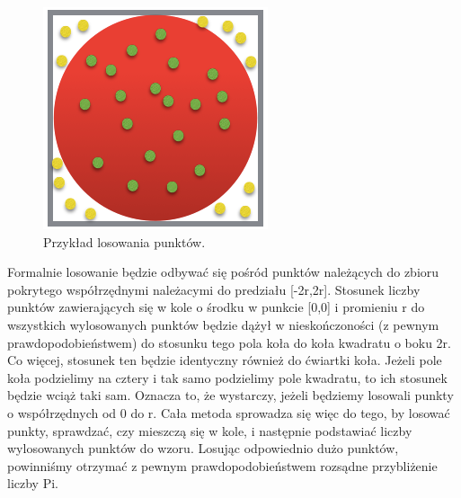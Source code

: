 \documentclass[a4paper,12pt]{article}		%
\begin{document}
\begin{figure}[h!]
\centering
\includegraphics[scale=0.7]{Resources/Losowanie.png}
\caption{Przykład losowania punktów.}
\end{figure}
 Formalnie losowanie będzie odbywać się pośród punktów należących do zbioru pokrytego współrzędnymi należacymi do predziału [-2r,2r]. Stosunek liczby punktów
zawierających się w kole o środku w punkcie [0,0] i promieniu r do wszystkich wylosowanych punktów będzie dążył w nieskończoności (z pewnym prawdopodobieństwem) do stosunku tego pola koła do koła kwadratu o boku 2r. Co więcej, stosunek ten będzie identyczny również do ćwiartki koła. Jeżeli pole koła podzielimy na cztery i tak samo podzielimy pole kwadratu, to ich stosunek będzie wciąż taki sam. Oznacza to, że wystarczy, jeżeli będziemy losowali punkty o współrzędnych od 0 do r. Cała metoda sprowadza się więc do tego, by losować punkty, sprawdzać, czy mieszczą się w kole, i następnie podstawiać liczby wylosowanych punktów do wzoru. Losując odpowiednio dużo punktów, powinniśmy otrzymać z pewnym prawdopodobieństwem rozsądne przybliżenie liczby Pi.
\end{document}
